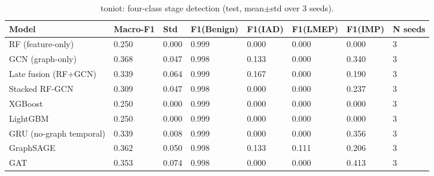 \begin{table}[t]
\centering
\caption{toniot: four-class stage detection (test, mean$\pm$std over 3 seeds).}
\label{tab:toniot_stage_detection}
\begin{tabular}{llllllll}
\toprule
Model & Macro-F1 & Std & F1(Benign) & F1(IAD) & F1(LMEP) & F1(IMP) & N seeds \\
\midrule
RF (feature-only) & 0.250 & 0.000 & 0.999 & 0.000 & 0.000 & 0.000 & 3 \\
GCN (graph-only) & 0.368 & 0.047 & 0.998 & 0.133 & 0.000 & 0.340 & 3 \\
Late fusion (RF+GCN) & 0.339 & 0.064 & 0.999 & 0.167 & 0.000 & 0.190 & 3 \\
Stacked RF-GCN & 0.309 & 0.047 & 0.998 & 0.000 & 0.000 & 0.237 & 3 \\
XGBoost & 0.250 & 0.000 & 0.999 & 0.000 & 0.000 & 0.000 & 3 \\
LightGBM & 0.250 & 0.000 & 0.999 & 0.000 & 0.000 & 0.000 & 3 \\
GRU (no-graph temporal) & 0.339 & 0.008 & 0.999 & 0.000 & 0.000 & 0.356 & 3 \\
GraphSAGE & 0.362 & 0.050 & 0.998 & 0.133 & 0.111 & 0.206 & 3 \\
GAT & 0.353 & 0.074 & 0.998 & 0.000 & 0.000 & 0.413 & 3 \\
\bottomrule
\end{tabular}
\end{table}
